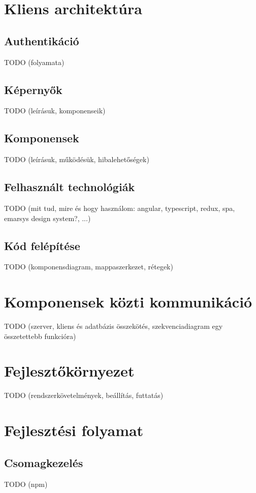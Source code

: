 \documentclass{elteikthesis}
\begin{document}
	\section{Kliens architektúra}
	\subsection{Authentikáció}
	TODO (folyamata)
	
	\subsection{Képernyők}
	TODO (leírásuk, komponenseik)
	
	\subsection{Komponensek}
	TODO (leírásuk, működésük, hibalehetőségek)
	
	\subsection{Felhasznált technológiák}
	TODO (mit tud, mire és hogy használom: angular, typescript, redux, spa, emarsys design system?, ...)
	
	\subsection{Kód felépítése}
	TODO (komponensdiagram, mappaszerkezet, rétegek)
	
	\section{Komponensek közti kommunikáció}
	TODO (szerver, kliens és adatbázis összekötés, szekvenciadiagram egy összetettebb funkcióra)
	
	\section{Fejlesztőkörnyezet}
	TODO (rendszerkövetelmények, beállítás, futtatás)
	
	\section{Fejlesztési folyamat}
	\subsection{Csomagkezelés}
	TODO (npm)
	
\end{document}
